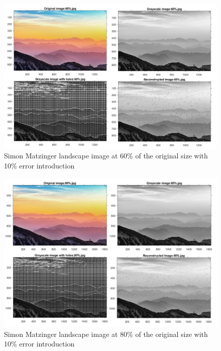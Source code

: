 \begin{figure}[!ht]
\center \includegraphics[scale=0.31]{SimonMatzinger60.jpg}
\caption{Simon Matzinger landscape image at 60\% of the original size with 10\% error introduction}
\label{fig:SimonMatzinger60}
\end{figure}

\begin{figure}[!ht]
\center \includegraphics[scale=0.31]{SimonMatzinger80.jpg}
\caption{Simon Matzinger landscape image at 80\% of the original size with 10\% error introduction}
\label{fig:SimonMatzinger80}
\end{figure}

